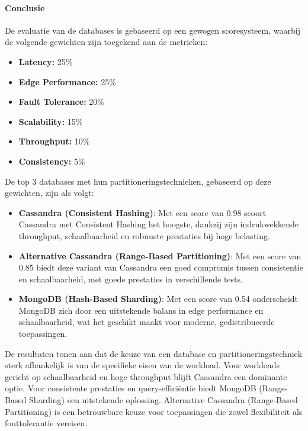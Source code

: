 \paragraph{Conclusie}
De evaluatie van de databases is gebaseerd op een gewogen scoresysteem, waarbij de volgende gewichten zijn toegekend aan de metrieken:
\begin{itemize}
	\item \textbf{Latency:} 25\%
	\item \textbf{Edge Performance:} 25\%
	\item \textbf{Fault Tolerance:} 20\%
	\item \textbf{Scalability:} 15\%
	\item \textbf{Throughput:} 10\%
	\item \textbf{Consistency:} 5\%
\end{itemize}

De top 3 databases met hun partitioneringstechnieken, gebaseerd op deze gewichten, zijn als volgt:

\begin{itemize}
    \item \textbf{Cassandra (Consistent Hashing)}: Met een score van 0.98 scoort Cassandra met Consistent Hashing het hoogste, dankzij zijn indrukwekkende throughput, schaalbaarheid en robuuste prestaties bij hoge belasting.
    \item \textbf{Alternative Cassandra (Range-Based Partitioning)}: Met een score van 0.85 biedt deze variant van Cassandra een goed compromis tussen consistentie en schaalbaarheid, met goede prestaties in verschillende tests.
    \item \textbf{MongoDB (Hash-Based Sharding)}: Met een score van 0.54 onderscheidt MongoDB zich door een uitstekende balans in edge performance en schaalbaarheid, wat het geschikt maakt voor moderne, gedistribueerde toepassingen.
\end{itemize}

De resultaten tonen aan dat de keuze van een database en partitioneringstechniek sterk afhankelijk is van de specifieke eisen van de workload.
Voor workloads gericht op schaalbaarheid en hoge throughput blijft Cassandra een dominante optie. Voor consistente prestaties en query-efficiëntie biedt MongoDB (Range-Based Sharding) een uitstekende oplossing.
Alternative Cassandra (Range-Based Partitioning) is een betrouwbare keuze voor toepassingen die zowel flexibiliteit als fouttolerantie vereisen.